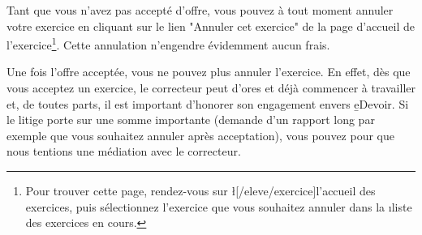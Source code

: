 ﻿Tant que vous n'avez pas accepté d'offre, vous pouvez à tout moment annuler votre exercice en cliquant sur le lien "Annuler cet exercice" de la page d'accueil de l'exercice\footnote{Pour trouver cette page, rendez-vous sur \l[/eleve/exercice]{l'accueil des exercices}, puis sélectionnez l'exercice que vous souhaitez annuler dans la \i{liste des exercices en cours}.}. Cette annulation n'engendre évidemment aucun frais.

Une fois l'offre acceptée, vous ne pouvez plus annuler l'exercice. En effet, dès que vous acceptez un exercice, le correcteur peut d'ores et déjà commencer à travailler et, de toutes parts, il est important d'honorer son engagement envers \b{eDevoir}.
Si le litige porte sur une somme importante (demande d'un rapport long par exemple que vous souhaitez annuler après acceptation), vous pouvez  pour que nous tentions une médiation avec le correcteur.